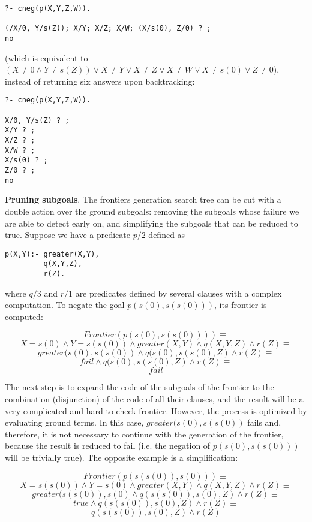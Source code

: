 \documentclass{llncs}
\begin{document}
\begin{verbatim}
?- cneg(p(X,Y,Z,W)).

(/X/0, Y/s(Z)); X/Y; X/Z; X/W; (X/s(0), Z/0) ? ;
no
\end{verbatim}

\noindent
(which is equivalent to $ (X \neq 0 \wedge Y\neq s(Z)) \vee X \neq Y
\vee X \neq Z \vee X \neq W \vee X \neq s(0) \vee Z \neq 0$),
instead of returning six answers upon backtracking:
\begin{verbatim}
?- cneg(p(X,Y,Z,W)).

X/0, Y/s(Z) ? ;
X/Y ? ;
X/Z ? ;
X/W ? ;
X/s(0) ? ;
Z/0 ? ;
no
\end{verbatim}


\noindent
{\bf Pruning subgoals}. The frontiers generation search tree can be
cut with a double action over the ground subgoals: removing the
subgoals whose failure we are able to detect early on, and simplifying the
subgoals that can be reduced to true. Suppose  we have a predicate $p/2$
defined as
\begin{verbatim}
p(X,Y):- greater(X,Y),
         q(X,Y,Z),
         r(Z).
\end{verbatim}
\noindent
where $q/3$ and $r/1$ are predicates defined by several
clauses with a complex computation. To negate
the goal $p(s(0),s(s(0)))$, its frontier is computed:

$$Frontier(p(s(0),s(s(0)))) \equiv $$
$${ X=s(0) \wedge Y=s(s(0)) \wedge
  greater(X,Y) \wedge q(X,Y,Z) \wedge r(Z) } \equiv $$
$${ greater(s(0),s(s(0)) \wedge q(s(0),s(s(0),Z) \wedge r(Z) } \equiv $$
$${ fail  \wedge q(s(0),s(s(0),Z) \wedge r(Z) } \equiv $$
$$fail $$

The next step is to expand the code of the subgoals of the frontier to
the combination (disjunction) of the code of all their clauses, and the
result will be a very complicated and hard to check frontier.
However, the process is optimized by evaluating ground terms. In this
case, $greater(s(0),s(s(0))$ fails and, therefore, it is not necessary to
continue with the generation of the frontier, because the result is
reduced to fail (i.e. the negation of $p (s(0), s(s(0)))$ will be
trivially true). The opposite example is a simplification:

$$Frontier(p(s(s(0)),s(0))) \equiv $$
$${ X=s(s(0)) \wedge Y=s(0) \wedge greater(X,Y) \wedge q(X,Y,Z) \wedge
  r(Z) } \equiv $$
$${ greater(s(s(0)),s(0) \wedge q(s(s(0)),s(0),Z) \wedge r(Z) } \equiv
$$
$${ true \wedge q(s(s(0)),s(0),Z) \wedge r(Z) } \equiv $$
$${ q(s(s(0)),s(0),Z) \wedge r(Z) } $$
\end{document}

